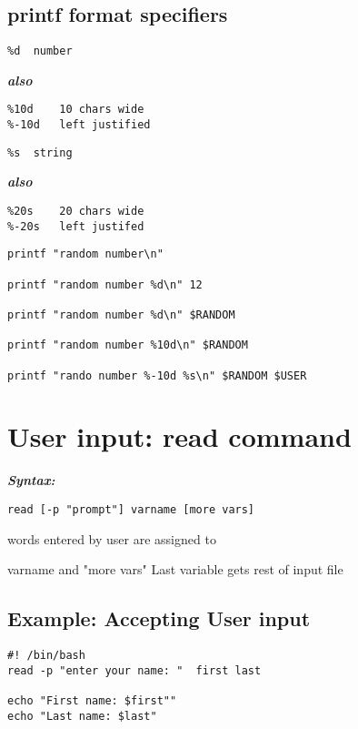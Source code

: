 \documentclass{report}
\begin{document}
\subsection{printf format specifiers}
\begin{verbatim}
%d  number
\end{verbatim}
\textit{\textbf{also}}
\begin{verbatim}
%10d    10 chars wide
%-10d   left justified
\end{verbatim}
\begin{verbatim}
%s  string
\end{verbatim}
\textit{\textbf{also}}
\begin{verbatim}
%20s    20 chars wide
%-20s   left justifed
\end{verbatim}
\newpage
\begin{mdframed}
\begin{verbatim}
printf "random number\n"

printf "random number %d\n" 12

printf "random number %d\n" $RANDOM

printf "random number %10d\n" $RANDOM

printf "rando number %-10d %s\n" $RANDOM $USER
\end{verbatim}
\end{mdframed}
\section{User input: read command}
\textit{\textbf{Syntax:}}
\begin{verbatim}
read [-p "prompt"] varname [more vars]
\end{verbatim}
words entered by user are assigned to \vspace{2mm}

\noindent varname and "more vars"
\bigbreak \noindent
Last variable gets rest of input file
\subsection{Example: Accepting User input}
\begin{verbatim}
#! /bin/bash
read -p "enter your name: "  first last

echo "First name: $first""
echo "Last name: $last"
\end{verbatim}
\end{document}
